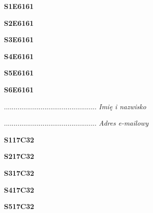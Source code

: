 \begin{turn}{90}\huge \textbf{S1E6161}\end{turn}

\begin{turn}{90}\huge \textbf{S2E6161}\end{turn}

\begin{turn}{90}\huge \textbf{S3E6161}\end{turn}

\begin{turn}{90}\huge \textbf{S4E6161}\end{turn}

\begin{turn}{90}\huge \textbf{S5E6161}\end{turn}

\begin{turn}{90}\huge \textbf{S6E6161}\end{turn}

\begin{turn}{90}\begin{minipage}{\linewidth} \vspace{20mm} ................................................  \textit{Imię i nazwisko}\end{minipage}\end{turn}

\begin{turn}{90}\begin{minipage}{\linewidth} \vspace{20mm} ................................................  \textit{Adres e-mailowy}\end{minipage}\end{turn}

\begin{turn}{90}\huge \textbf{S117C32}\end{turn}

\begin{turn}{90}\huge \textbf{S217C32}\end{turn}

\begin{turn}{90}\huge \textbf{S317C32}\end{turn}

\begin{turn}{90}\huge \textbf{S417C32}\end{turn}

\begin{turn}{90}\huge \textbf{S517C32}\end{turn}

